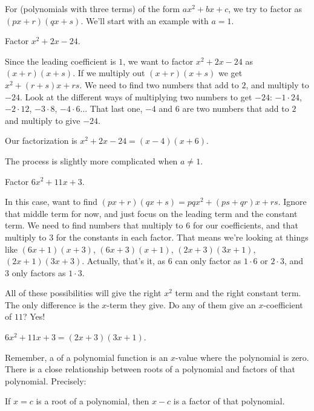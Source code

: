 \documentclass{ximera}
\begin{document}
For  (polynomials with three terms) of the form $ax^2 + bx + c$, we try to factor as $(px+r)(qx+s)$.  We'll start with an example with $a=1$.
\begin{example}
	Factor $x^2+2x-24$.
	\begin{explanation}
		Since the leading coefficient is $1$, we want to factor $x^2+2x-24$ as $(x+r)(x+s)$.  If we multiply out $(x+r)(x+s)$ we get
		$x^2 + (r+s)x + rs$.  We need to find two numbers that add to $2$,
		and multiply to $-24$.  Look at the different ways of multiplying two numbers to get $-24$:  $-1 \cdot 24$, $-2 \cdot 12$, $-3 \cdot 8$, $-4 \cdot 6$...
		That last one, $-4$ and $6$ are two numbers that add to $2$ and multiply to give $-24$.
		
		Our factorization is $x^2+2x-24 = (x-4)(x+6)$.
	\end{explanation}
\end{example}

The process is slightly more complicated when $a \neq 1$.
\begin{example}
	Factor $6x^2 + 11 x + 3$.
	\begin{explanation}
		In this case, want to find $(px+r)(qx+s) = pq x^2 + (ps+qr) x+ rs$.  Ignore that middle term for now, and just focus on the leading term and the constant term.
		We need to find numbers that multiply to $6$ for our coefficients, and that multiply to $3$ for the constants in each factor.
		That means we're looking at things like $(6x+1)(x+3)$, $(6x+3)(x+1)$, $(2x+3)(3x+1)$, $(2x+1)(3x+3)$.   Actually, that's it, as $6$ can only
		factor as $1 \cdot 6$ or $2 \cdot 3$, and $3$ only factors as $1 \cdot 3$.
		
		All of these possibilities will give the right $x^2$ term and the right constant term.  The only difference is the $x$-term they give.  Do any of them
		give an $x$-coefficient of $11$?  Yes!
		
		$6x^2+11x+3 = (2x+3)(3x+1)$.
	\end{explanation}
\end{example}

Remember, a  of a polynomial function is an $x$-value where the polynomial is zero. 
There is a close relationship between roots of a polynomial and factors of that polynomial.  Precisely:
\begin{theorem}
If $x=c$ is a root of a polynomial, then $x-c$ is a factor of that polynomial.
\end{theorem}
\end{document}

